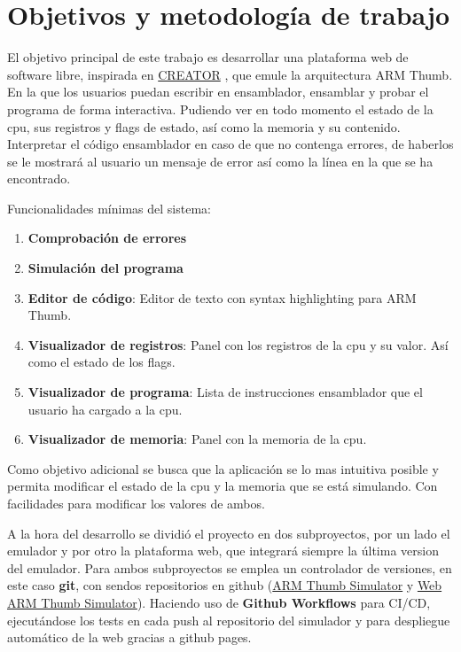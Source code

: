 \section{Objetivos y metodología de trabajo}
{
    El objetivo principal de este trabajo es desarrollar una plataforma web de software libre, inspirada en \href{https://creatorsim.github.io/creator/}{CREATOR} , que emule la arquitectura ARM Thumb.
    En la que los usuarios puedan escribir en ensamblador, ensamblar y probar el programa de forma interactiva.
    Pudiendo ver en todo momento el estado de la cpu, sus registros y flags de estado, así como la memoria y su contenido. \\

    Interpretar el código ensamblador en caso de que no contenga errores, de haberlos se le mostrará al usuario un mensaje de error así como la línea en la que se ha encontrado. 
    
    Funcionalidades mínimas del sistema:
    \begin{enumerate}
        \item \textbf{Comprobación de errores}
        \item \textbf{Simulación del programa}
        \item \textbf{Editor de código}: Editor de texto con syntax highlighting para ARM Thumb.
        \item \textbf{Visualizador de registros}: Panel con los registros de la cpu y su valor. Así como el estado de los flags.
        \item \textbf{Visualizador de programa}: Lista de instrucciones ensamblador que el usuario ha cargado a la cpu.
        \item \textbf{Visualizador de memoria}: Panel con la memoria de la cpu.
    \end{enumerate}

    Como objetivo adicional se busca que la aplicación se lo mas intuitiva posible y permita modificar el estado de la cpu y la memoria que se está simulando. Con facilidades para modificar los valores de ambos. \\
    \clearpage

    A la hora del desarrollo se dividió el proyecto en dos subproyectos, por un lado el emulador y por otro la plataforma web, que integrará siempre la última version del emulador.
    Para ambos subproyectos se emplea un controlador de versiones, en este caso \textbf{git}, con sendos repositorios en github (\href{https://github.com/FreddyJS/armthumb-emul}{ARM Thumb Simulator} y \href{https://github.com/FreddyJS/wthumb}{Web ARM Thumb Simulator}).
    Haciendo uso de \textbf{Github Workflows} para CI/CD, ejecutándose los tests en cada push al repositorio del simulador y para despliegue automático de la web
    gracias a github pages. \\

}
